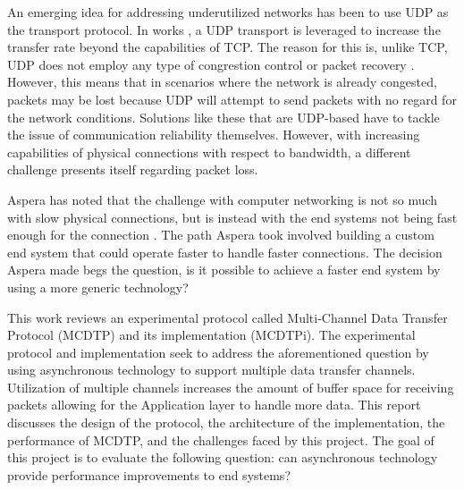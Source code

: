 An emerging idea for addressing underutilized networks has been to use UDP as the transport protocol. In works \cite{He2002,Fan2010,Aspera2016,Meiss2007,gu2007udt}, a UDP transport is leveraged to increase the transfer rate beyond the capabilities of TCP. The reason for this is, unlike TCP, UDP does not employ any type of congrestion control or packet recovery \cite{postel1980user}. However, this means that in scenarios where the network is already congested, packets may be lost because UDP will attempt to send packets with no regard for the network conditions. Solutions like these that are UDP-based have to tackle the issue of communication reliability themselves. However, with increasing capabilities of physical connections with respect to bandwidth, a different challenge presents itself regarding packet loss.

Aspera has noted that the challenge with computer networking is not so much with slow physical connections, but is instead with the end systems not being fast enough for the connection \cite{Fan2010,Aspera2016}. The path Aspera took involved building a custom end system that could operate faster to handle faster connections. The decision Aspera made begs the question, is it possible to achieve a faster end system by using a more generic technology?

This work reviews an experimental protocol called Multi-Channel Data Transfer Protocol (MCDTP) and its implementation (MCDTPi). The experimental protocol and implementation seek to address the aforementioned question by using asynchronous technology to support multiple data transfer channels. Utilization of multiple channels increases the amount of buffer space for receiving packets allowing for the Application layer to handle more data. This report discusses the design of the protocol, the architecture of the implementation, the performance of MCDTP, and the challenges faced by this project. The goal of this project is to evaluate the following question: can asynchronous technology provide performance improvements to end systems?
